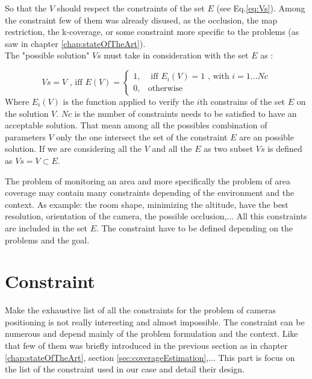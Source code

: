 So that the $V$ should respect the constraints of the set $E$ (see Eq.\ref{eq:Vs}). Among the constraint few of them was already disused, as the occlusion, the map restriction, the k-coverage, or some constraint more specific to the problems (as saw in chapter \ref{chap:stateOfTheArt}).\\
 The "possible solution" $Vs$ must take in consideration with the set $E$ as :

\begin{equation}\label{eq:Vs}
Vs=V \mbox{ , iff } E(V)=\begin{cases}1, & \mbox{  iff } E_i(V)=1 \mbox{ , with } i=1...Nc \\ 0, & \mbox{otherwise} 
\end{cases} 
\end{equation}
Where $E_i(V)$ is the function applied to verify  the $i$th constrains of the set $E$ on the solution $V$. $Nc$ is the number of constraints needs to be satisfied to have an acceptable solution.
That mean among all the possibles combination of parameters $V$ only the one intersect the set of the constraint $E$ are an possible solution.  If we are considering  all the $V$ and all the $E$ as two subset $Vs$ is defined as $Vs=V\subset E$. 

The problem of monitoring an area and more specifically the problem of area coverage may contain many constraints depending of the environment and the context. As example: the room shape, minimizing  the altitude,  have the best resolution, orientation of the camera, the possible occlusion,... All this constraints are included in the set $E$. 
The constraint have to be defined depending on the problems and the goal.

\section{Constraint}\label{sec:constraint}

Make the exhaustive list of all the constraints for the problem of cameras positioning is not really interesting and almost impossible. The constraint can be numerous and depend mainly of the problem formulation and the context. Like that few of them was briefly introduced in the previous section as in chapter \ref{chap:stateOfTheArt}, section \ref{sec:coverageEstimation},... This part is focus on the list of the constraint used in our case and detail their design.

